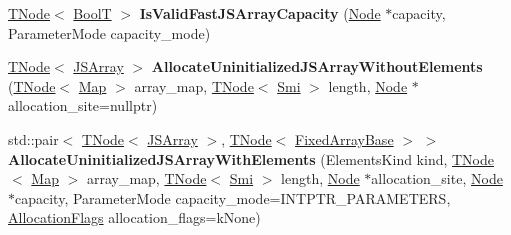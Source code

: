 \begin{DoxyCompactItemize}
\item 
\mbox{\label{classv8_1_1internal_1_1CodeStubAssembler_a719bae1a062f25a75682ea33ff8e14e5}} 
\mbox{\hyperlink{classv8_1_1internal_1_1compiler_1_1TNode}{T\+Node}}$<$ \mbox{\hyperlink{structv8_1_1internal_1_1BoolT}{BoolT}} $>$ {\bfseries Is\+Valid\+Fast\+J\+S\+Array\+Capacity} (\mbox{\hyperlink{classv8_1_1internal_1_1compiler_1_1Node}{Node}} $\ast$capacity, Parameter\+Mode capacity\+\_\+mode)
\item 
\mbox{\label{classv8_1_1internal_1_1CodeStubAssembler_a3c5c18e4397ca00d47e2f4b8b757c6b6}} 
\mbox{\hyperlink{classv8_1_1internal_1_1compiler_1_1TNode}{T\+Node}}$<$ \mbox{\hyperlink{classv8_1_1internal_1_1JSArray}{J\+S\+Array}} $>$ {\bfseries Allocate\+Uninitialized\+J\+S\+Array\+Without\+Elements} (\mbox{\hyperlink{classv8_1_1internal_1_1compiler_1_1TNode}{T\+Node}}$<$ \mbox{\hyperlink{classv8_1_1internal_1_1Map}{Map}} $>$ array\+\_\+map, \mbox{\hyperlink{classv8_1_1internal_1_1compiler_1_1TNode}{T\+Node}}$<$ \mbox{\hyperlink{classv8_1_1internal_1_1Smi}{Smi}} $>$ length, \mbox{\hyperlink{classv8_1_1internal_1_1compiler_1_1Node}{Node}} $\ast$allocation\+\_\+site=nullptr)
\item 
\mbox{\label{classv8_1_1internal_1_1CodeStubAssembler_af0c36aecda4ae91ef5a98deed0a7a799}} 
std\+::pair$<$ \mbox{\hyperlink{classv8_1_1internal_1_1compiler_1_1TNode}{T\+Node}}$<$ \mbox{\hyperlink{classv8_1_1internal_1_1JSArray}{J\+S\+Array}} $>$, \mbox{\hyperlink{classv8_1_1internal_1_1compiler_1_1TNode}{T\+Node}}$<$ \mbox{\hyperlink{classv8_1_1internal_1_1FixedArrayBase}{Fixed\+Array\+Base}} $>$ $>$ {\bfseries Allocate\+Uninitialized\+J\+S\+Array\+With\+Elements} (Elements\+Kind kind, \mbox{\hyperlink{classv8_1_1internal_1_1compiler_1_1TNode}{T\+Node}}$<$ \mbox{\hyperlink{classv8_1_1internal_1_1Map}{Map}} $>$ array\+\_\+map, \mbox{\hyperlink{classv8_1_1internal_1_1compiler_1_1TNode}{T\+Node}}$<$ \mbox{\hyperlink{classv8_1_1internal_1_1Smi}{Smi}} $>$ length, \mbox{\hyperlink{classv8_1_1internal_1_1compiler_1_1Node}{Node}} $\ast$allocation\+\_\+site, \mbox{\hyperlink{classv8_1_1internal_1_1compiler_1_1Node}{Node}} $\ast$capacity, Parameter\+Mode capacity\+\_\+mode=I\+N\+T\+P\+T\+R\+\_\+\+P\+A\+R\+A\+M\+E\+T\+E\+RS, \mbox{\hyperlink{classv8_1_1base_1_1Flags}{Allocation\+Flags}} allocation\+\_\+flags=k\+None)
\item 

\end{DoxyCompactItemize}
